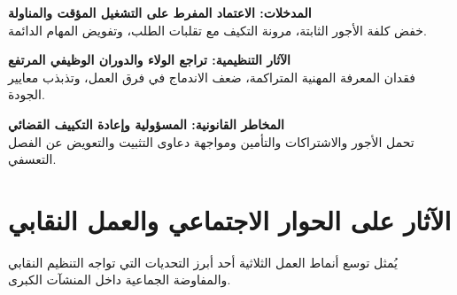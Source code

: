 \vspace{0.8em}
\begin{center}
\begin{minipage}{0.92\textwidth}

\begin{tcolorbox}[colback=lightgray!30, colframe=maincolor, arc=4pt, width=\textwidth, boxrule=1pt, halign=center, valign=center]
\textbf{المدخلات: الاعتماد المفرط على التشغيل المؤقت والمناولة}\\[3pt]
\small خفض كلفة الأجور الثابتة، مرونة التكيف مع تقلبات الطلب، وتفويض المهام الدائمة.
\end{tcolorbox}

\centering{\color{maincolor}\Large$\Downarrow$}

\begin{tcolorbox}[colback=lightgray!30, colframe=maincolor, arc=4pt, width=\textwidth, boxrule=1pt, halign=center, valign=center]
\textbf{الآثار التنظيمية: تراجع الولاء والدوران الوظيفي المرتفع}\\[3pt]
\small فقدان المعرفة المهنية المتراكمة، ضعف الاندماج في فرق العمل، وتذبذب معايير الجودة.
\end{tcolorbox}

\centering{\color{maincolor}\Large$\Downarrow$}

\begin{tcolorbox}[colback=maincolor!15, colframe=maincolor, arc=4pt, width=\textwidth, boxrule=1.2pt, halign=center, valign=center]
\textbf{المخاطر القانونية: المسؤولية وإعادة التكييف القضائي}\\[3pt]
\small تحمل الأجور والاشتراكات والتأمين ومواجهة دعاوى التثبيت والتعويض عن الفصل التعسفي.
\end{tcolorbox}

\vspace{0.8em}
\label{fig:impact-entreprise}

\end{minipage}
\end{center}
\vspace{0.5em}

\section{الآثار على الحوار الاجتماعي والعمل النقابي}

يُمثل توسع أنماط العمل الثلاثية أحد أبرز التحديات التي تواجه التنظيم النقابي والمفاوضة الجماعية داخل المنشآت الكبرى.

